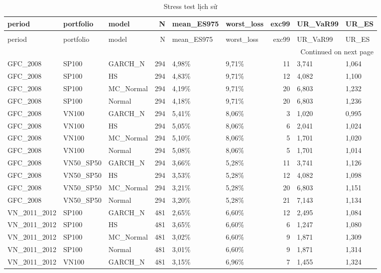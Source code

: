 \begin{longtable}{lllrllrll}
\caption{Stress test lịch sử} \label{tab:T11_stress_historical} \\
\toprule
period & portfolio & model & N & mean\_ES975 & worst\_loss & exc99 & UR\_VaR99 & UR\_ES \\
\midrule
\endfirsthead
\caption[]{Stress test lịch sử} \\
\toprule
period & portfolio & model & N & mean\_ES975 & worst\_loss & exc99 & UR\_VaR99 & UR\_ES \\
\midrule
\endhead
\midrule
\multicolumn{9}{r}{Continued on next page} \\
\midrule
\endfoot
\bottomrule
\endlastfoot
GFC\_2008 & SP100 & GARCH\_N & 294 & 4,98\% & 9,71\% & 11 & 3,741 & 1,064 \\
GFC\_2008 & SP100 & HS & 294 & 4,83\% & 9,71\% & 12 & 4,082 & 1,100 \\
GFC\_2008 & SP100 & MC\_Normal & 294 & 4,19\% & 9,71\% & 20 & 6,803 & 1,232 \\
GFC\_2008 & SP100 & Normal & 294 & 4,18\% & 9,71\% & 20 & 6,803 & 1,236 \\
GFC\_2008 & VN100 & GARCH\_N & 294 & 5,41\% & 8,06\% & 3 & 1,020 & 0,995 \\
GFC\_2008 & VN100 & HS & 294 & 5,05\% & 8,06\% & 6 & 2,041 & 1,024 \\
GFC\_2008 & VN100 & MC\_Normal & 294 & 5,10\% & 8,06\% & 5 & 1,701 & 1,020 \\
GFC\_2008 & VN100 & Normal & 294 & 5,08\% & 8,06\% & 5 & 1,701 & 1,014 \\
GFC\_2008 & VN50\_SP50 & GARCH\_N & 294 & 3,66\% & 5,28\% & 11 & 3,741 & 1,126 \\
GFC\_2008 & VN50\_SP50 & HS & 294 & 3,53\% & 5,28\% & 12 & 4,082 & 1,098 \\
GFC\_2008 & VN50\_SP50 & MC\_Normal & 294 & 3,21\% & 5,28\% & 20 & 6,803 & 1,151 \\
GFC\_2008 & VN50\_SP50 & Normal & 294 & 3,20\% & 5,28\% & 21 & 7,143 & 1,134 \\
VN\_2011\_2012 & SP100 & GARCH\_N & 481 & 2,65\% & 6,60\% & 12 & 2,495 & 1,084 \\
VN\_2011\_2012 & SP100 & HS & 481 & 3,65\% & 6,60\% & 6 & 1,247 & 1,080 \\
VN\_2011\_2012 & SP100 & MC\_Normal & 481 & 3,02\% & 6,60\% & 9 & 1,871 & 1,309 \\
VN\_2011\_2012 & SP100 & Normal & 481 & 3,01\% & 6,60\% & 9 & 1,871 & 1,314 \\
VN\_2011\_2012 & VN100 & GARCH\_N & 481 & 3,15\% & 6,96\% & 7 & 1,455 & 1,324 \\

\end{longtable}
